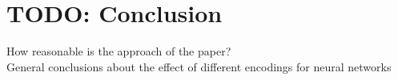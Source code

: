 \documentclass[12pt,twoside]{article}
\theoremstyle{plain}
\theoremstyle{definition}
\theoremstyle{remark}
\begin{document}

\section{TODO: Conclusion}
\label{sec:concl}

How reasonable is the approach of the paper?\\
General conclusions about the effect of different encodings for neural networks\\

%
%
\newpage


\end{document}
